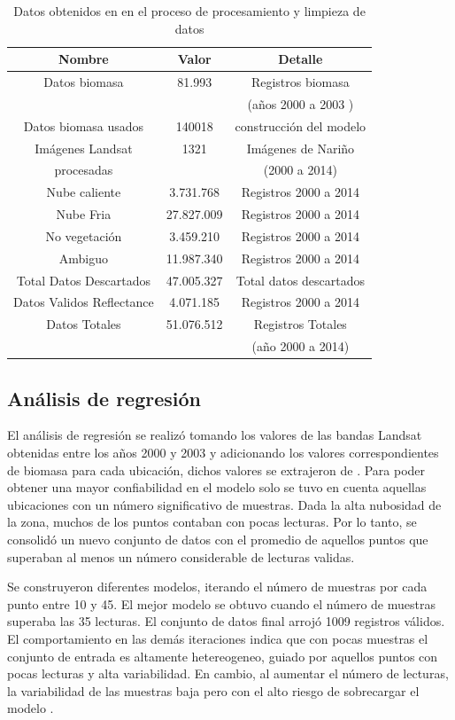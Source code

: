 \begin{table}
\caption{Datos obtenidos en en el proceso de procesamiento y limpieza  de datos}
\label{tab:datos}
\centering
\begin{tabular}{c c c}
\toprule
 Nombre & Valor& Detalle  \\
\midrule
Datos biomasa & 81.993 & Registros biomasa \\
 & & (años 2000 a 2003 \cite{baccini2008afirst})\\
Datos biomasa usados & 140018 & construcción del modelo\\
\hline
Imágenes Landsat& 1321 & Imágenes de Nariño\\
procesadas & & (2000 a 2014) \\
Nube caliente & 3.731.768 & Registros 2000 a 2014 \\
Nube Fria & 27.827.009 & Registros 2000 a 2014 \\
No vegetación & 3.459.210 & Registros 2000 a 2014 \\
Ambiguo & 11.987.340 & Registros 2000 a 2014 \\
\hline
Total Datos Descartados & 47.005.327 & Total datos descartados \\
Datos Validos Reflectance & 4.071.185 & Registros 2000 a 2014 \\
\hline
Datos Totales & 51.076.512 & Registros Totales\\
& & (año 2000 a 2014) \\
\bottomrule
\end{tabular}
\end{table}

\subsection{Análisis de regresión}

El análisis de regresión se realizó tomando los valores de las bandas Landsat obtenidas entre los años 2000 y 2003 y adicionando los valores correspondientes de biomasa para cada ubicación, dichos valores  se extrajeron de \cite{baccini2008afirst}.  Para poder obtener una mayor confiabilidad en el modelo solo se tuvo en cuenta aquellas ubicaciones con un número significativo de muestras.  Dada la alta nubosidad de la zona, muchos de los puntos contaban con pocas lecturas.  Por lo tanto, se consolidó un nuevo conjunto de datos con el promedio de aquellos puntos que superaban al menos un número considerable de lecturas validas.  

Se construyeron diferentes modelos, iterando el número de muestras por cada punto entre 10 y 45.  El mejor modelo se obtuvo cuando el número de muestras superaba las 35 lecturas.  El conjunto de datos final arrojó 1009 registros válidos.  El comportamiento en las demás iteraciones indica que con pocas muestras el conjunto de entrada es altamente hetereogeneo, guiado por aquellos puntos con pocas lecturas y alta variabilidad.  En cambio, al aumentar el número de lecturas, la variabilidad de las muestras baja pero con el alto riesgo de sobrecargar el modelo \cite{babyak_what_2004}. 

